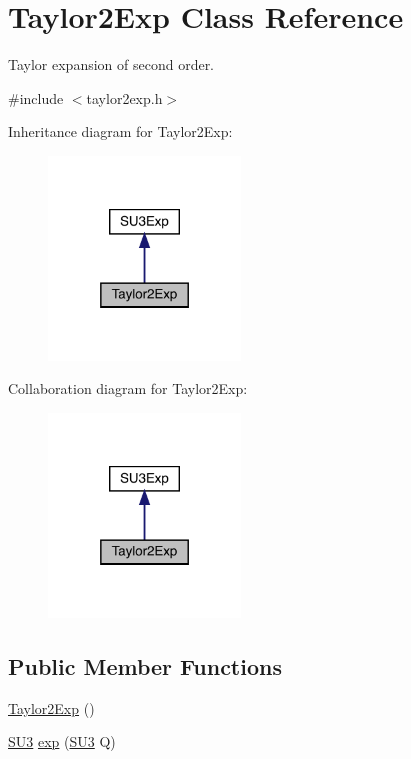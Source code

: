 \hypertarget{class_taylor2_exp}{}\section{Taylor2\+Exp Class Reference}
\label{class_taylor2_exp}


Taylor expansion of second order.  




{\ttfamily \#include $<$taylor2exp.\+h$>$}



Inheritance diagram for Taylor2\+Exp\+:
\nopagebreak
\begin{figure}[H]
\begin{center}
\leavevmode
\includegraphics[width=145pt]{class_taylor2_exp__inherit__graph}
\end{center}
\end{figure}


Collaboration diagram for Taylor2\+Exp\+:
\nopagebreak
\begin{figure}[H]
\begin{center}
\leavevmode
\includegraphics[width=145pt]{class_taylor2_exp__coll__graph}
\end{center}
\end{figure}
\subsection*{Public Member Functions}
\begin{DoxyCompactItemize}
\item 
\mbox{\hyperlink{class_taylor2_exp_ac3b48be4c567e163f7baaa041121a93f}{Taylor2\+Exp}} ()
\item 
\mbox{\hyperlink{class_s_u3}{S\+U3}} \mbox{\hyperlink{class_taylor2_exp_af1d32ac99447c063e364ebf37ba2752e}{exp}} (\mbox{\hyperlink{class_s_u3}{S\+U3}} Q)
\end{DoxyCompactItemize}


